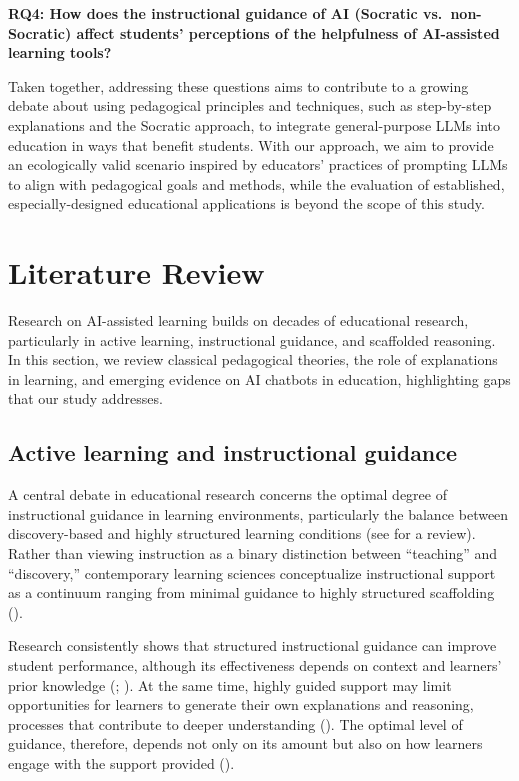 \documentclass[
  12pt,
]{article}
\begin{document}
\textbf{RQ4: How does the instructional guidance of AI (Socratic vs.~non-Socratic) affect students' perceptions of the helpfulness of AI-assisted learning tools?}

Taken together, addressing these questions aims to contribute to a growing debate about using pedagogical principles and techniques, such as step-by-step explanations and the Socratic approach, to integrate general-purpose LLMs into education in ways that benefit students. With our approach, we aim to provide an ecologically valid scenario inspired by educators' practices of prompting LLMs to align with pedagogical goals and methods, while the evaluation of established, especially-designed educational applications is beyond the scope of this study.

\section{Literature Review}\label{literature-review}

Research on AI-assisted learning builds on decades of educational research, particularly in active learning, instructional guidance, and scaffolded reasoning. In this section, we review classical pedagogical theories, the role of explanations in learning, and emerging evidence on AI chatbots in education, highlighting gaps that our study addresses.

\subsection{Active learning and instructional guidance}\label{active-learning-and-instructional-guidance}

A central debate in educational research concerns the optimal degree of instructional guidance in learning environments, particularly the balance between discovery-based and highly structured learning conditions (see  for a review). Rather than viewing instruction as a binary distinction between ``teaching'' and ``discovery,'' contemporary learning sciences conceptualize instructional support as a continuum ranging from minimal guidance to highly structured scaffolding ().

Research consistently shows that structured instructional guidance can improve student performance, although its effectiveness depends on context and learners' prior knowledge (; ). At the same time, highly guided support may limit opportunities for learners to generate their own explanations and reasoning, processes that contribute to deeper understanding (). The optimal level of guidance, therefore, depends not only on its amount but also on how learners engage with the support provided ().
\end{document}
